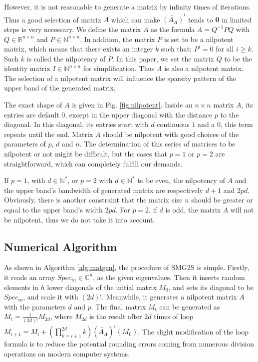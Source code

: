 However, it is not reasonable to generate a matrix by infinity times of iterations. Thus a good selection of matrix $A$ which can make $\widetilde{(A_A)}^i$ tends to $\textbf{0}$ in limited steps is very necessary. We define the matrix $A$  as the formula $A=Q^{-1}PQ$ with $Q \in \mathbb{R}^{n \times n}$ and $P \in \mathbb{N}^{n \times n}$. In addition, the matrix $P$ is set to be a nilpotent matrix, which means that there exists an integer $k$ such that: $P^i=0$ for all $i \ge k$. Such $k$ is called the nilpotency of $P$.  In this paper, we set the matrix $Q$ to be the identity matrix $I \in \mathbb{N}^{n \times n}$ for simplification. Thus $A$ is also a nilpotent matrix.  The selection of a nilpotent matrix will influence the sparsity pattern of the upper band of the generated matrix. 

The exact shape of $A$ is given in Fig. \ref{fig:nilpotent}. Inside an $n \times n$ matrix $A$, its entries are default $0$, except in the upper diagonal with the distance $p$ to the diagonal. In this diagonal, its entries start with $d$ continuous $1$ and a $0$, this term repeats until the end. Matrix $A$ should be nilpotent with good choices of the parameters of $p$, $d$ and $n$. The determination of this series of matrices to be nilpotent or not might be difficult, but the cases that $p=1$ or $p=2$ are straightforward, which can completely fulfill our demands.

If $p=1$, with $d \in \mathbb{N^*}$, or $p=2$ with $d \in \mathbb{N^*}$ to be even, the nilpotency of $A$ and the upper band's bandwidth of generated matrix are respectively $d+1$  and $2pd$. Obviously, there is another constraint that the matrix size $n$ should be greater or equal to the upper band's width $2pd$. For $p=2$, if $d$ is odd, the matrix $A$ will not be nilpotent, thus we do not take it into account.

\subsection{Numerical Algorithm}

As shown in Algorithm \ref{alg:matgen}, the procedure of SMG2S is simple. Firstly, it reads an array $Spec_{in} \in \mathbb{C}^{n}$, as the given eigenvalues. Then it inserts random elements in $h$ lower diagonals of the initial matrix $M_0$, and sets its diagonal to be $Spec_{in}$, and scale it with $(2d)!$. Meanwhile, it generates a nilpotent matrix $A$ with the parameters $d$ and $p$. The final matrix $M_t$ can be generated as $M_t=\frac{1}{(2d)!}M_{2d}$, where $M_{2d}$ is the result after $2d$ times of loop $M_{i+1}=M_i+(\prod_{k=i+1}^{2d}k)(\widetilde{A_A})^i(M_0)$. The slight modification of the loop formula is to reduce the potential rounding errors coming from numerous division operations on modern computer systems.

